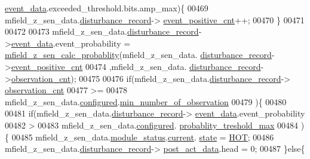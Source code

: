 \begin{DoxyCode}
      \hyperlink{a00028_a8c0bda69e71ef674e60da47ad0be9ab0}{event\_data}.exceeded\_threshold.bits.amp\_max)\{
00469                  mfield\_z\_sen\_data.\hyperlink{a00027_ac9b38e2c1d3f1013a88d33506c754152}{disturbance\_record}->
      \hyperlink{a00028_a7397b9d76d4b57500f27bb23d258a18a}{event\_positive\_cnt}++;
00470              \}
00471 
00472 
00473              mfield\_z\_sen\_data.\hyperlink{a00027_ac9b38e2c1d3f1013a88d33506c754152}{disturbance\_record}->\hyperlink{a00028_a8c0bda69e71ef674e60da47ad0be9ab0}{event\_data}.event\_probability
       = \hyperlink{a00053_a8a5c3986dbe778d199b6e3b485f7a34b}{mfield\_z\_sen\_calc\_probablity}(mfield\_z\_sen\_data.
      \hyperlink{a00027_ac9b38e2c1d3f1013a88d33506c754152}{disturbance\_record}->\hyperlink{a00028_a7397b9d76d4b57500f27bb23d258a18a}{event\_positive\_cnt}
00474                                                                                   ,mfield\_z\_sen\_data.
      \hyperlink{a00027_ac9b38e2c1d3f1013a88d33506c754152}{disturbance\_record}->\hyperlink{a00028_ad5b0bac02ce266b91b2b52a1c3ea1d78}{observation\_cnt});
00475 
00476              \textcolor{keywordflow}{if}(mfield\_z\_sen\_data.\hyperlink{a00027_ac9b38e2c1d3f1013a88d33506c754152}{disturbance\_record}->
      \hyperlink{a00028_ad5b0bac02ce266b91b2b52a1c3ea1d78}{observation\_cnt}
00477                 >=
00478                 mfield\_z\_sen\_data.\hyperlink{a00027_a94b2d1f6ea4ab334c74d24984dd27843}{configured}.\hyperlink{a00021_ae8665e8bf422c1482442d6949ba28408}{min\_number\_of\_observation}
00479                )\{
00480 
00481                    \textcolor{keywordflow}{if}(mfield\_z\_sen\_data.\hyperlink{a00027_ac9b38e2c1d3f1013a88d33506c754152}{disturbance\_record}->
      \hyperlink{a00028_a8c0bda69e71ef674e60da47ad0be9ab0}{event\_data}.event\_probability
00482                     >
00483                     mfield\_z\_sen\_data.\hyperlink{a00027_a94b2d1f6ea4ab334c74d24984dd27843}{configured}.
      \hyperlink{a00021_a7e2d217b9c9051d361319180a426851c}{probablity\_treshold\_max}
00484                     )\{
00485                          mfield\_z\_sen\_data.\hyperlink{a00027_adfab5a5d8b45a93dfb13edb24e2b80e3}{module\_status}.\hyperlink{a00019_acf41ffc11da291c2f9f0fcb02ee72b98}{current}.
      \hyperlink{a00019_a6b8d8e916bc56265a3fd279bd26b6d1b}{state} = \hyperlink{a00021_a1eb14cc432874ddacd1934791dbe12a3}{HOT};
00486                           mfield\_z\_sen\_data.\hyperlink{a00027_ac9b38e2c1d3f1013a88d33506c754152}{disturbance\_record}->
      \hyperlink{a00028_a9c699c0cc82d0baa6e49195f185ab34f}{post\_act\_data}.head = 0;
00487                    \}\textcolor{keywordflow}{else}\{

\end{DoxyCode}
